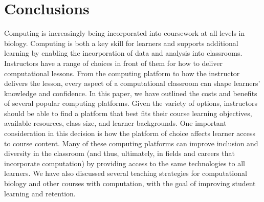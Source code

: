 \section{Conclusions}

Computing is increasingly being incorporated into coursework at all levels in biology.
Computing is both a key skill for learners and supports additional learning by enabling the incorporation of data and analysis into classrooms. 
Instructors have a range of choices in front of them for how to deliver computational lessons.
From the computing platform to how the instructor delivers the lesson, every aspect of a computational classroom can shape learners' knowledge and confidence. 
In this paper, we have outlined the costs and benefits of several popular computing platforms.
Given the variety of options, instructors should be able to find a platform that best fits their course learning objectives, available resources, class size, and learner backgrounds.
One important consideration in this decision is how the platform of choice affects learner access to course content.
Many of these computing platforms can improve inclusion and diversity in the classroom (and thus, ultimately, in fields and careers that incorporate computation) by providing access to the same technologies to all learners.
We have also discussed several teaching strategies for computational biology and other courses with computation, with the goal of improving student learning and retention.





